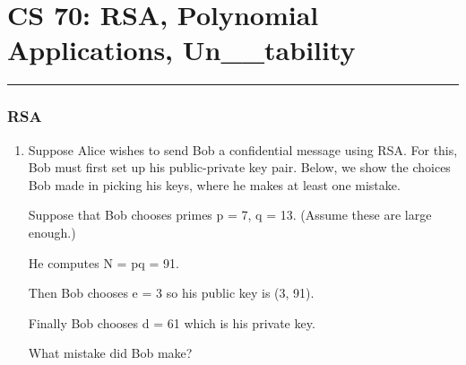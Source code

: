 \documentclass{article}
\begin{document}
    
    \part*{CS 70: RSA, Polynomial Applications, Un\_\_tability}
    \vspace{-7pt}
    \hrule
    \vspace{7pt}
    
    \section{RSA}
    \begin{enumerate}
        \item Suppose Alice wishes to send Bob a confidential message using RSA. For this, Bob must first set up his public-private key pair. Below, we show the choices Bob made in picking his keys, where he makes at least one mistake.
        
        Suppose that Bob chooses primes p = 7, q = 13. (Assume these are large enough.)
        
        He computes N = pq = 91.
        
        Then Bob chooses e = 3 so his public key is (3, 91).

        Finally Bob chooses d = 61 which is his private key.

        What mistake did Bob make?
        \begin{solution}
        \end{solution}
    \end{enumerate}
\end{document}
